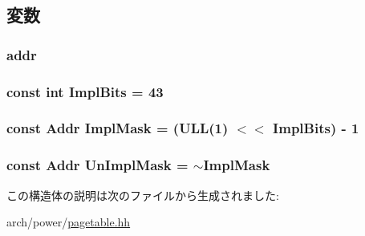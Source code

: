 \subsection{変数}
\hypertarget{structPowerISA_1_1VAddr_a0bb77b4ba61e408313e1118250f9278c}{
\subsubsection[{addr}]{ {\bf addr}}}
\label{structPowerISA_1_1VAddr_a0bb77b4ba61e408313e1118250f9278c}
\hypertarget{structPowerISA_1_1VAddr_a90a805e8bf3e59628bdcc4ca67fc68c4}{
\subsubsection[{ImplBits}]{\setlength{\rightskip}{0pt plus 5cm}const int {\bf ImplBits} = 43}}
\label{structPowerISA_1_1VAddr_a90a805e8bf3e59628bdcc4ca67fc68c4}
\hypertarget{structPowerISA_1_1VAddr_af9099d6c5264dd55210ff2a90bec4c2e}{
\subsubsection[{ImplMask}]{\setlength{\rightskip}{0pt plus 5cm}const {\bf Addr} {\bf ImplMask} = (ULL(1) $<$$<$ {\bf ImplBits}) -\/ 1}}
\label{structPowerISA_1_1VAddr_af9099d6c5264dd55210ff2a90bec4c2e}
\hypertarget{structPowerISA_1_1VAddr_aea265d87906fd130da86ab5d0977f26a}{
\subsubsection[{UnImplMask}]{\setlength{\rightskip}{0pt plus 5cm}const {\bf Addr} {\bf UnImplMask} = $\sim${\bf ImplMask}}}
\label{structPowerISA_1_1VAddr_aea265d87906fd130da86ab5d0977f26a}


この構造体の説明は次のファイルから生成されました:\begin{DoxyCompactItemize}
\item 
arch/power/\hyperlink{power_2pagetable_8hh}{pagetable.hh}\end{DoxyCompactItemize}
